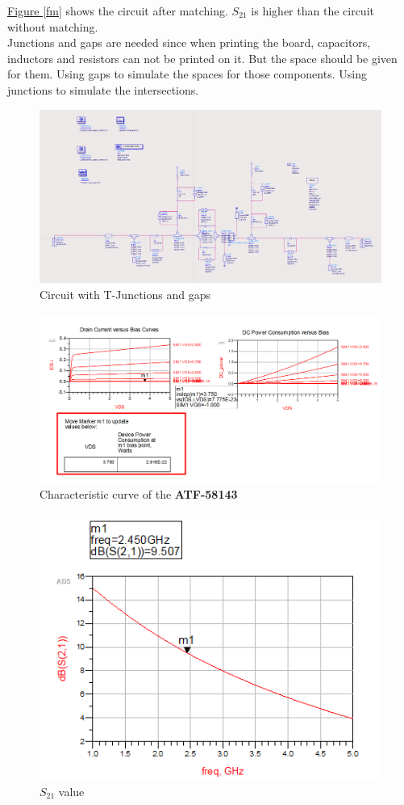 \documentclass[12pt,a4paper]{report}
\begin{document}
\hyperref[fm]{Figure \ref*{fm}} shows the circuit after matching. $S_{21}$ is higher than the circuit without matching.\\
Junctions and gaps are needed since when printing the board, capacitors, inductors and resistors can not be printed on it. But the 
space should be given for them. Using gaps to simulate the spaces for those components. Using junctions to simulate the intersections.
\begin{figure}
    \centerline{\includegraphics[scale=0.5]{Junctions_Added.PNG}}
    \caption{Circuit with T-Junctions and gaps}
    \label{junctions}
\end{figure}

\begin{figure}
    \centerline{\includegraphics[scale=0.4]{DCIV.PNG}}
    \caption{Characteristic curve of the \textbf{ATF-58143}}
    \label{fig:DCIV}
\end{figure}

\begin{figure}
    \centerline{\includegraphics{S21.PNG}}
    \caption{$S_{21}$ value}
    \label{S21}
\end{figure}
\end{document}
